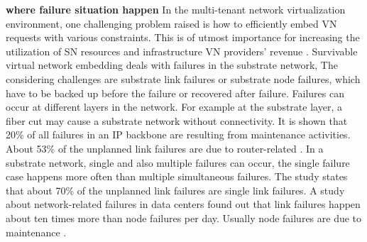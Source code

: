 

\textbf{where failure situation happen} In the multi-tenant network virtualization environment, one challenging problem raised is how to efficiently embed VN requests with various constraints. This is of utmost importance for increasing the utilization of SN resources and infrastructure VN providers’ revenue \cite{koponen2014network}. Survivable virtual network embedding deals with failures in the substrate network, The considering challenges are substrate link failures or substrate node failures, which have to be backed up before the failure or recovered after failure. Failures can occur at different layers in the network. For example at the substrate layer, a fiber cut may cause a substrate network without connectivity. It is shown that 20\% of all failures in an IP backbone are resulting from maintenance activities\cite{markopoulou2004characterization}. About 53\% of the unplanned link failures are due to router-related \cite{markopoulou2004characterization}. In a substrate network, single and also multiple failures can occur, the single failure case happens more often than multiple simultaneous failures. The study \cite{markopoulou2004characterization} states that about 70\% of the unplanned link failures are single link failures. A study \cite{gill2011understanding} about network-related failures in data centers found out that link failures happen about ten times more than node failures per day. Usually node failures are due to maintenance \cite{gill2011understanding}.


